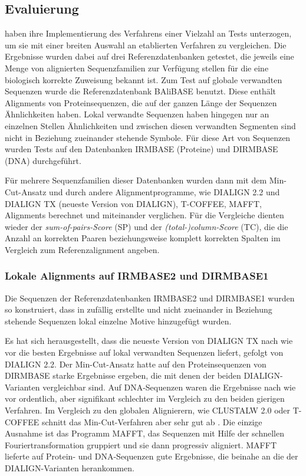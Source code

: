 \subsection{Evaluierung}

\cite{cpm10} haben ihre Implementierung des Verfahrens einer Vielzahl an Tests unterzogen, um sie mit einer breiten Auswahl an etablierten Verfahren zu vergleichen. Die Ergebnisse wurden dabei auf drei Referenzdatenbanken getestet, die jeweils eine Menge von alignierten Sequenzfamilien zur Verfügung stellen für die eine biologisch korrekte Zuweisung bekannt ist. Zum Test auf globale verwandten Sequenzen wurde die Referenzdatenbank BAliBASE benutzt. Diese enthält Alignments von Proteinsequenzen, die auf der ganzen Länge der Sequenzen Ähnlichkeiten haben. Lokal verwandte Sequenzen haben hingegen nur an einzelnen Stellen Ähnlichkeiten und zwischen diesen verwandten Segmenten sind nicht in Beziehung zueinander stehende Symbole. Für diese Art von Sequenzen wurden Tests auf den Datenbanken IRMBASE (Proteine) und DIRMBASE (DNA) durchgeführt.

Für mehrere Sequenzfamilien dieser Datenbanken wurden dann mit dem Min-Cut-Ansatz und durch andere Alignmentprogramme, wie DIALIGN 2.2 und DIALIGN TX (neueste Version von DIALIGN), T-COFFEE, MAFFT, Alignments berechnet und miteinander verglichen. Für die Vergleiche dienten wieder der \emph{sum-of-pairs-Score} (SP) und der \emph{(total-)column-Score} (TC), die die Anzahl an korrekten Paaren beziehungsweise komplett korrekten Spalten im Vergleich zum Referenzalignment angeben.

\subsubsection{Lokale Alignments auf IRMBASE2 und DIRMBASE1}

Die Sequenzen der Referenzdatenbanken IRMBASE2 und DIRMBASE1 wurden so konstruiert, dass in zufällig erstellte und nicht zueinander in Beziehung stehende Sequenzen lokal einzelne Motive hinzugefügt wurden.

Es hat sich herausgestellt, dass die neueste Version von DIALIGN TX nach wie vor die besten Ergebnisse auf lokal verwandten Sequenzen liefert, gefolgt von DIALIGN 2.2. Der Min-Cut-Ansatz hatte auf den Proteinsequenzen von DIRMBASE starke Ergebnisse ergeben, die mit denen der beiden DIALIGN-Varianten vergleichbar sind. Auf DNA-Sequenzen waren die Ergebnisse nach wie vor ordentlich, aber signifikant schlechter im Vergleich zu den beiden gierigen Verfahren. Im Vergleich zu den globalen Alignierern, wie CLUSTALW 2.0 oder T-COFFEE schnitt das Min-Cut-Verfahren aber sehr gut ab \cite{cpm10}. Die einzige Ausnahme ist das Programm MAFFT, das Sequenzen mit Hilfe der schnellen Fouriertransformation gruppiert und sie dann progressiv aligniert. MAFFT lieferte auf Protein- und DNA-Sequenzen gute Ergebnisse, die beinahe an die der DIALIGN-Varianten herankommen.

